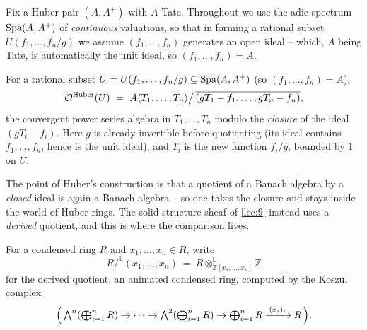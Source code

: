 Fix a Huber pair $(A,A^{+})$ with $A$ Tate. Throughout we use the adic spectrum
$\operatorname{Spa}(A,A^{+})$ of \emph{continuous} valuations, so that in forming a rational
subset $U(f_{1},\dots,f_{n}/g)$ we assume $(f_{1},\dots,f_{n})$ generates an open
ideal -- which, $A$ being Tate, is automatically the unit ideal, so
$(f_{1},\dots,f_{n})=A$.

\begin{proposition}
\label{prop:10:huber-presheaf}
For a rational subset $U=U(f_{1},\dots,f_{n}/g)\subseteq\operatorname{Spa}(A,A^{+})$ (so
$(f_{1},\dots,f_{n})=A$),
\begin{equation}
\label{eq:10:huber-presheaf}
\mathcal{O}^{\mathrm{Huber}}(U)\ =\ A\langle T_{1},\dots,T_{n}\rangle\big/\,\overline{(gT_{1}-f_{1},\dots,gT_{n}-f_{n})},
\end{equation}
the convergent power series algebra in $T_{1},\dots,T_{n}$ modulo the
\emph{closure} of the ideal $(gT_{i}-f_{i})$. Here $g$ is already invertible
before quotienting (its ideal contains $f_{1},\dots,f_{n}$, hence is the unit
ideal), and $T_{i}$ is the new function $f_{i}/g$, bounded by $1$ on $U$.
\end{proposition}

The point of Huber's construction is that a quotient of a Banach algebra by a
\emph{closed} ideal is again a Banach algebra -- so one takes the closure and
stays inside the world of Huber rings. The solid structure sheaf of \cref{lec:9}
instead uses a \emph{derived} quotient, and this is where the comparison lives.

\begin{notation}
\label{not:10:koszul}
For a condensed ring $R$ and $x_{1},\dots,x_{n}\in R$, write
\begin{equation*}
R/^{\mathbb{L}}(x_{1},\dots,x_{n})\ =\ R\otimes^{\mathbb{L}}_{\mathbb{Z}[x_{1},\dots,x_{n}]}\mathbb{Z}
\end{equation*}
for the derived quotient, an animated condensed ring, computed by the Koszul
complex
\begin{equation*}
\Bigl(\,\textstyle\bigwedge^{n}(\textstyle\bigoplus_{i=1}^{n}R)\to\cdots\to
\bigwedge^{2}(\textstyle\bigoplus_{i=1}^{n}R)\to
\textstyle\bigoplus_{i=1}^{n}R\xrightarrow{\,(x_{i})_{i}\,}R\,\Bigr).
\end{equation*}
\end{notation}

